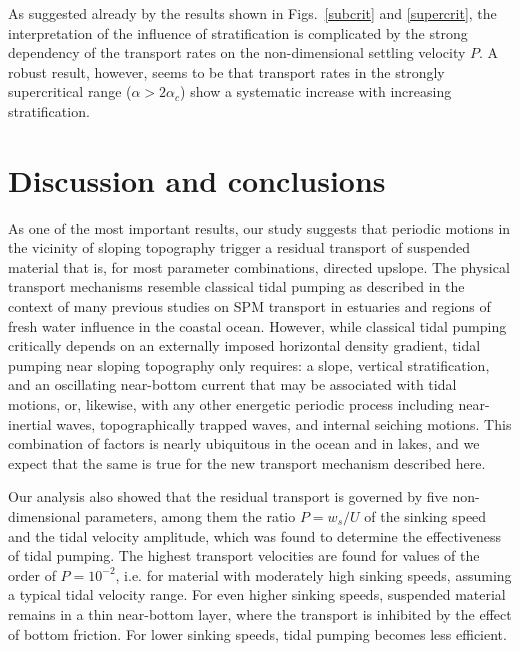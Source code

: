 As suggested already by the results shown in Figs.\ \ref{subcrit} and
\ref{supercrit}, the interpretation of the influence of stratification
is complicated by the strong dependency of the transport rates on the
non-dimensional settling velocity $P$. A robust result, however, seems
to be that transport rates in the strongly supercritical range
($\alpha > 2 \alpha_c$) show a systematic increase with increasing
stratification.


\section{Discussion and conclusions\label{sec:conclusions}}
As one of the most important results, our study suggests that periodic
motions in the vicinity of sloping topography trigger a residual
transport of suspended material that is, for most parameter
combinations, directed upslope. The physical transport mechanisms
resemble classical tidal pumping as described in the context of many
previous studies on SPM transport in estuaries and regions of fresh
water influence \citep[ROFIs,][]{Simpson97a} in the coastal
ocean. However, while classical tidal pumping critically depends on an
externally imposed horizontal density gradient, tidal pumping near
sloping topography only requires: a slope, vertical stratification,
and an oscillating near-bottom current that may be associated with
tidal motions, or, likewise, with any other energetic periodic process
including near-inertial waves, topographically trapped waves, and
internal seiching motions. This combination of factors is nearly
ubiquitous in the ocean and in lakes, and we expect that the same is
true for the new transport mechanism described here.


Our analysis also showed that the residual transport is governed by
five non-dimensional parameters, among them the ratio $P=w_s/U$ of the
sinking speed and the tidal velocity amplitude, which was found to
determine the effectiveness of tidal pumping. The highest transport
velocities are found for values of the order of $P = 10^{-2}$,
i.e. for material with moderately high sinking speeds, assuming a
typical tidal velocity range. For even higher sinking speeds,
suspended material remains in a thin near-bottom layer, where the
transport is inhibited by the effect of bottom friction. For lower
sinking speeds, tidal pumping becomes less efficient.

